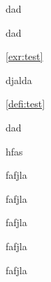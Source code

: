 \documentclass[
	leqno, %
	a4paper, %
	fontsize=12pt, %
	twoside=false, %
	open=any, %
	chapterentrydots=true, %
	numbers=noenddot, %
    UTF-8, %
	toc=nottotoc,
	BCOR=12mm,
	DIV=calc,
]{styles/kaobook}
\begin{document}
\begin{exr}
	dad
\end{exr}	

\begin{exr}\label{exr:test}
	dad
\end{exr}	

\cref{exr:test}


\begin{defi}[jflasj]\label{defi:test}
djalda
\end{defi}

\cref{defi:test}

\begin{cor}
	dad
\end{cor}

\begin{lem}[fkaj]
	hfas
\end{lem}

\begin{prop}
	fafjla
\end{prop}

\begin{thm}
	fafjla
\end{thm}

\begin{ppt}
	fafjla
\end{ppt}

\begin{expl}
	fafjla
\end{expl}

\begin{rmk}
	fafjla
\end{rmk}


\backmatter %
\end{document}

